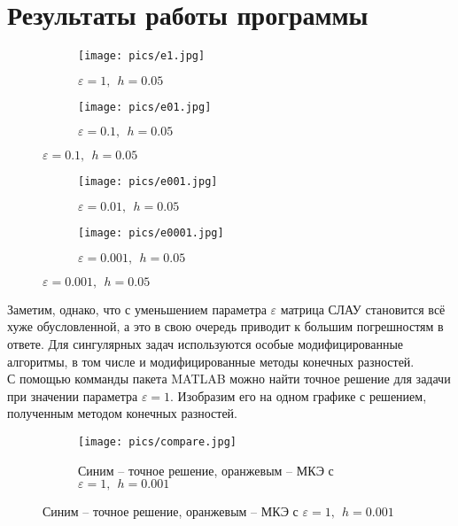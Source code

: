 \documentclass[a4paper,12pt]{extarticle}
\begin{document}
    \section{Результаты работы программы}
   
    \begin{figure}[H]
    \begin{subfigure}{0.5\textwidth}
    \texttt{[image: pics/e1.jpg]} 
    \caption{$\varepsilon=1, ~~ h = 0.05$}
    \label{fig:subim1}
    \end{subfigure}
    \begin{subfigure}{0.5\textwidth}
    \texttt{[image: pics/e01.jpg]} 
    \caption{$\varepsilon=0.1, ~~ h = 0.05$}
    \label{fig:subim1}
    \end{subfigure}
    \end{figure}
    
    \begin{figure}[H]
    \ContinuedFloat
    \begin{subfigure}{0.5\textwidth}
    \texttt{[image: pics/e001.jpg]} 
    \caption{$\varepsilon=0.01, ~~ h = 0.05$}
    \label{fig:subim1}
    \end{subfigure}
    \begin{subfigure}{0.5\textwidth}
    \texttt{[image: pics/e0001.jpg]} 
    \caption{$\varepsilon=0.001, ~~ h = 0.05$}
    \label{fig:subim1}
    \end{subfigure}
    
    \end{figure}
    
    Заметим, однако, что с уменьшением параметра $\varepsilon$ матрица
    СЛАУ становится всё хуже обусловленной, а это в свою очередь приводит
    к большим погрешностям в ответе. Для сингулярных задач используются
    особые модифицированные алгоритмы, в том числе и модифицированные
    методы конечных разностей.\\
    С помощью комманды  пакета MATLAB можно найти точное
    решение для задачи при значении параметра $\varepsilon = 1$.
    Изобразим его на одном графике с решением, полученным методом
    конечных разностей.
    
    \begin{center}
    \begin{figure}[H]
    \begin{subfigure}{0.75\textwidth}
    \texttt{[image: pics/compare.jpg]} 
    \caption{Синим -- точное решение, оранжевым -- МКЭ с $\varepsilon=1, ~~ h = 0.001 $}
    \label{fig}
    \end{subfigure}
    \end{figure}
    \end{center}
    
\end{document}
